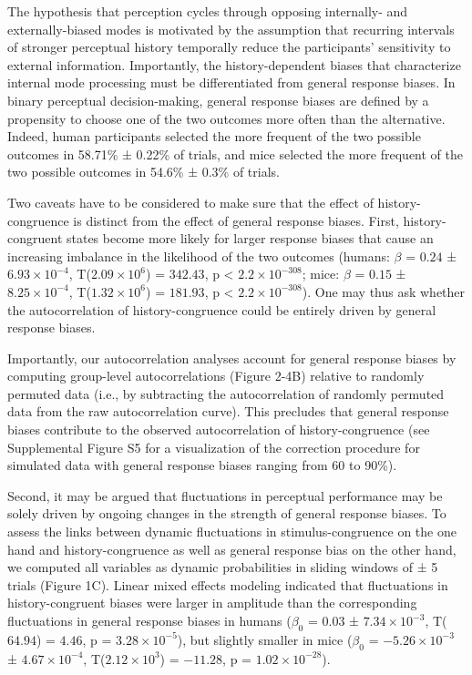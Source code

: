 \documentclass[
]{article}
\begin{document}
The hypothesis that perception cycles through opposing internally- and
externally-biased modes is motivated by the assumption that recurring
intervals of stronger perceptual history temporally reduce the
participants' sensitivity to external information. Importantly, the
history-dependent biases that characterize internal mode processing must
be differentiated from general response biases. In binary perceptual
decision-making, general response biases are defined by a propensity to
choose one of the two outcomes more often than the alternative. Indeed,
human participants selected the more frequent of the two possible
outcomes in 58.71\% ± 0.22\% of trials, and mice selected the more
frequent of the two possible outcomes in 54.6\% ± 0.3\% of trials.

Two caveats have to be considered to make sure that the effect of
history-congruence is distinct from the effect of general response
biases. First, history-congruent states become more likely for larger
response biases that cause an increasing imbalance in the likelihood of
the two outcomes (humans: \(\beta\) = \(0.24\) ±
\(\ensuremath{6.93\times 10^{-4}}\),
T(\(\ensuremath{2.09\times 10^{6}}\)) = \(342.43\), p < \(\ensuremath{2.2\times 10^{-308}}\); mice:
\(\beta\) = \(0.15\) ± \(\ensuremath{8.25\times 10^{-4}}\),
T(\(\ensuremath{1.32\times 10^{6}}\)) = \(181.93\), p < \(\ensuremath{2.2\times 10^{-308}}\)). One may
thus ask whether the autocorrelation of history-congruence could be
entirely driven by general response biases.

Importantly, our autocorrelation analyses account for general response
biases by computing group-level autocorrelations (Figure 2-4B) relative
to randomly permuted data (i.e., by subtracting the autocorrelation of
randomly permuted data from the raw autocorrelation curve). This
precludes that general response biases contribute to the observed
autocorrelation of history-congruence (see Supplemental Figure S5 for a
visualization of the correction procedure for simulated data with
general response biases ranging from 60 to 90\%).

Second, it may be argued that fluctuations in perceptual performance may
be solely driven by ongoing changes in the strength of general response
biases. To assess the links between dynamic fluctuations in
stimulus-congruence on the one hand and history-congruence as well as
general response bias on the other hand, we computed all variables as
dynamic probabilities in sliding windows of ± 5 trials (Figure 1C).
Linear mixed effects modeling indicated that fluctuations in
history-congruent biases were larger in amplitude than the corresponding
fluctuations in general response biases in humans (\(\beta_0\) =
\(0.03\) ± \(\ensuremath{7.34\times 10^{-3}}\), T(\(64.94\)) = \(4.46\),
p = \(\ensuremath{3.28\times 10^{-5}}\)), but slightly smaller in mice
(\(\beta_0\) = \(\ensuremath{-5.26\times 10^{-3}}\) ±
\(\ensuremath{4.67\times 10^{-4}}\),
T(\(\ensuremath{2.12\times 10^{3}}\)) = \(-11.28\), p =
\(\ensuremath{1.02\times 10^{-28}}\)).
\end{document}
